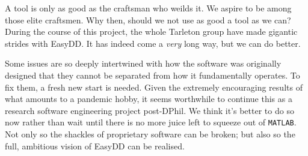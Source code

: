 A tool is only as good as the craftsman who weilds it. We aspire to be among those elite craftsmen. Why then, should we not use as good a tool as we can? During the course of this project, the whole Tarleton group have made gigantic strides with EasyDD. It has indeed come a \emph{very} long way, but we can do better.

Some issues are so deeply intertwined with how the software was originally designed that they cannot be separated from how it fundamentally operates. To fix them, a fresh new start is needed. Given the extremely encouraging results of what amounts to a pandemic hobby, it seems worthwhile to continue this as a research software engineering project post-DPhil. We think it's better to do so now rather than wait until there is no more juice left to squeeze out of \texttt{MATLAB}. Not only so the shackles of proprietary software can be broken; but also so the full, ambitious vision of EasyDD can be realised.
